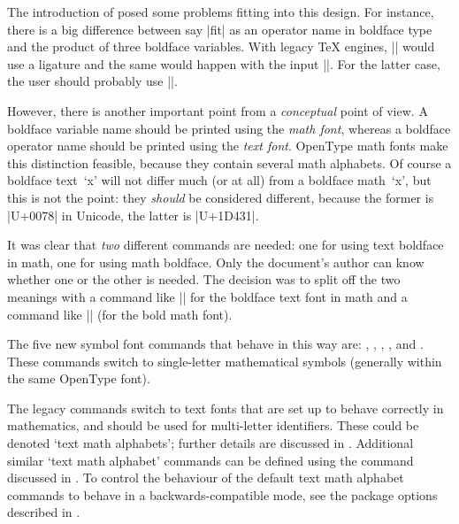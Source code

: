 The introduction of  posed some problems fitting into this design. For
instance, there is a big difference between say |fit| as an operator
name in boldface type and the product of three boldface variables.
With legacy \TeX{} engines, || would use a ligature and
the same would happen with the input ||.
For the latter case, the user should probably use ||.

However, there is another important point from a \emph{conceptual}
point of view. A boldface variable name should be printed using the
\emph{math font}, whereas a boldface operator name should be printed
using the \emph{text font}. OpenType math fonts make this distinction
feasible, because they contain several math alphabets. Of course a
boldface text~`x' will not differ much (or at all) from a boldface
math~`x', but this is not the point: they \emph{should} be considered
different, because the former is |U+0078| in Unicode, the latter is
|U+1D431|.

It was clear that \emph{two} different commands are needed: one for using text boldface in math,
one for using math boldface. Only the document's author can know
whether one or the other is needed. The decision was to split off
the two meanings with a command like |\mathbf| for the boldface text font
in math and a command like |\symbf| (for the bold math font).

The five new symbol font commands that behave in this way are: ,
, , , and .
These commands switch to single-letter mathematical symbols
(generally within the same OpenType font).

The legacy  commands switch to text fonts that are set up to behave
correctly in mathematics, and should be used for multi-letter identifiers.  These
could be denoted `text math alphabets'; further details are discussed
in .  Additional similar `text math alphabet'
commands can be defined using the  command
discussed in .  To control the behaviour of the
default text math alphabet commands to behave in a
backwards-compatible mode, see the package options described in
.


